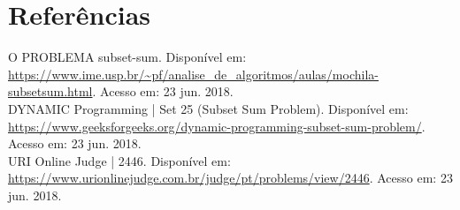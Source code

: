 \documentclass[12pt]{article}
\begin{document}
\section{Referências}
O PROBLEMA subset-sum. Disponível em: \url{https://www.ime.usp.br/~pf/analise_de_algoritmos/aulas/mochila-subsetsum.html}. Acesso em: 23 jun. 2018.\\
DYNAMIC Programming | Set 25 (Subset Sum Problem). Disponível em: \url{https://www.geeksforgeeks.org/dynamic-programming-subset-sum-problem/}. Acesso em: 23 jun. 2018.\\
URI Online Judge | 2446. Disponível em: \url{https://www.urionlinejudge.com.br/judge/pt/problems/view/2446}. Acesso em: 23 jun. 2018.
\end{document}
